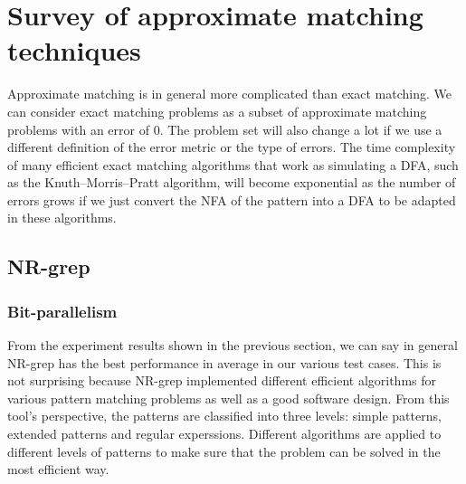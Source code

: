 \section{Survey of approximate matching techniques}
Approximate matching is in general more complicated than exact matching. We can consider exact matching problems as a subset of approximate matching problems with an error of 0. The problem set will also change a lot if we use a different definition of the error metric or the type of errors. The time complexity of many efficient exact matching algorithms that work as simulating a DFA, such as the Knuth–Morris–Pratt algorithm, will become exponential as the number of errors grows if we just convert the NFA of the pattern into a DFA to be adapted in these algorithms. 

\begin{comment}

\subsection{Dynamic programming}

One of the classical solutions to approximate matching problem is to use dynamic programming. This method is simple and easy to be implemented by programming. 



\subsection{Autamata simulation}
Another classical one is automata simulation. The algortihm BNDM  (we will explain later) over which NR-grep is built is basically a simulation of an NFA. 

\end{comment}


\subsection{NR-grep}

\subsubsection{Bit-parallelism}
From the experiment results shown in the previous section, we can say in general NR-grep has the best performance in average in our various test cases. This is not surprising because NR-grep implemented different efficient algorithms for various pattern matching problems as well as a good software design. From this tool's perspective, the patterns are classified into three levels: simple patterns, extended patterns and regular experssions. Different algorithms are applied to different levels of patterns to make sure that the problem can be solved in the most efficient way. 

